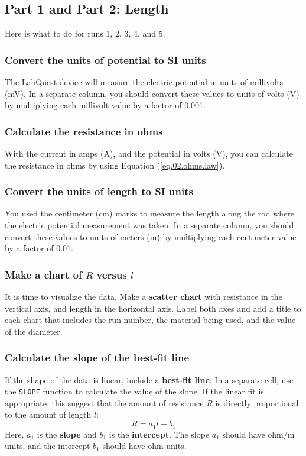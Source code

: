 \subsection{Part 1 and Part 2: Length}
%
Here is what to do for runs 1, 2, 3, 4, and 5.
%
\subsubsection{Convert the units of potential to SI units}
%
The LabQuest device will measure the electric potential in units of millivolts (mV). In a separate column, you should convert these values to units of volts (V) by multiplying each millivolt value by a factor of 0.001.
%
\subsubsection{Calculate the resistance in ohms}
%
With the current in amps (A), and the potential in volts (V), you can calculate the resistance in ohms by using Equation (\ref{eq.02.ohms.law}).
%
\subsubsection{Convert the units of length to SI units}
%
You used the centimeter (cm) marks to measure the length along the rod where the electric potential measurement was taken. In a separate column, you should convert these values to units of meters (m) by multiplying each centimeter value by a factor of 0.01.
%
\subsubsection{Make a chart of $R$ versus $l$}
%
It is time to visualize the data. Make a \textbf{scatter chart} with resistance in the vertical axis, and length in the horizontal axis. Label both axes and add a title to each chart that includes the run number, the material being used, and the value of the diameter.
%
\subsubsection{Calculate the slope of the best-fit line}
%
If the shape of the data is linear, include a \textbf{best-fit line}. In a separate cell, use the \texttt{SLOPE} function to calculate the value of the slope. If the linear fit is appropriate, this suggest that the amount of resistance $R$ is directly proportional to the amount of length $l$:
\begin{equation}
	R = a_{1} l + b_{1}
\end{equation}
Here, $a_{1}$ is the \textbf{slope} and $b_{1}$ is the \textbf{intercept}. The slope $a_{1}$ should have ohm/m units, and the intercept $b_{1}$ should have ohm units.

